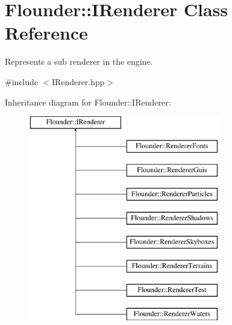 \hypertarget{class_flounder_1_1_i_renderer}{}\section{Flounder\+:\+:I\+Renderer Class Reference}
\label{class_flounder_1_1_i_renderer}


Represents a sub renderer in the engine.  




{\ttfamily \#include $<$I\+Renderer.\+hpp$>$}

Inheritance diagram for Flounder\+:\+:I\+Renderer\+:\begin{figure}[H]
\begin{center}
\leavevmode
\includegraphics[height=9.000000cm]{class_flounder_1_1_i_renderer}
\end{center}
\end{figure}
